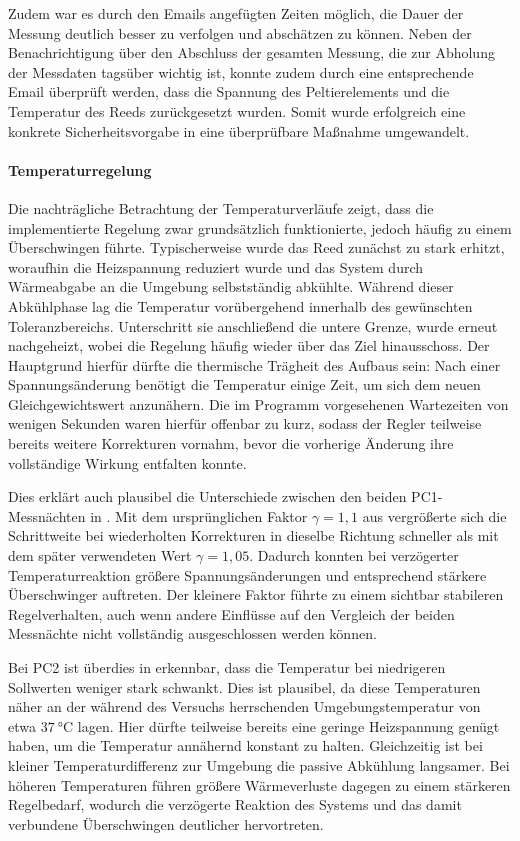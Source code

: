 \documentclass[11pt,a4paper]{article}
\begin{document}
Zudem war es durch den Emails angefügten Zeiten möglich, die Dauer der Messung deutlich besser zu verfolgen und abschätzen zu können. Neben der Benachrichtigung über den Abschluss der gesamten Messung, die zur Abholung der Messdaten tagsüber wichtig ist, konnte zudem durch eine entsprechende Email überprüft werden, dass die Spannung des Peltierelements und die Temperatur des Reeds zurückgesetzt wurden. Somit wurde erfolgreich eine konkrete Sicherheitsvorgabe in eine überprüfbare Maßnahme umgewandelt. 


\paragraph{Temperaturregelung}
Die nachträgliche Betrachtung der Temperaturverläufe zeigt, dass die implementierte Regelung zwar grundsätzlich funktionierte, jedoch häufig zu einem Überschwingen führte. Typischerweise wurde das Reed zunächst zu stark erhitzt, woraufhin die Heizspannung reduziert wurde und das System durch Wärmeabgabe an die Umgebung selbstständig abkühlte. Während dieser Abkühlphase lag die Temperatur vorübergehend innerhalb des gewünschten Toleranzbereichs. Unterschritt sie anschließend die untere Grenze, wurde erneut nachgeheizt, wobei die Regelung häufig wieder über das Ziel hinausschoss. Der Hauptgrund hierfür dürfte die thermische Trägheit des Aufbaus sein: Nach einer Spannungsänderung benötigt die Temperatur einige Zeit, um sich dem neuen Gleichgewichtswert anzunähern. Die im Programm vorgesehenen Wartezeiten von wenigen Sekunden waren hierfür offenbar zu kurz, sodass der Regler teilweise bereits weitere Korrekturen vornahm, bevor die vorherige Änderung ihre vollständige Wirkung entfalten konnte.

Dies erklärt auch plausibel die Unterschiede zwischen den beiden PC1-Messnächten in . Mit dem ursprünglichen Faktor $\gamma=1{,}1$ aus  vergrößerte sich die Schrittweite bei wiederholten Korrekturen in dieselbe Richtung schneller als mit dem später verwendeten Wert $\gamma=1{,}05$. Dadurch konnten bei verzögerter Temperaturreaktion größere Spannungsänderungen und entsprechend stärkere Überschwinger auftreten. Der kleinere Faktor führte zu einem sichtbar stabileren Regelverhalten, auch wenn andere Einflüsse auf den Vergleich der beiden Messnächte nicht vollständig ausgeschlossen werden können.

Bei PC2 ist überdies in  erkennbar, dass die Temperatur bei niedrigeren Sollwerten weniger stark schwankt. Dies ist plausibel, da diese Temperaturen näher an der während des Versuchs herrschenden Umgebungstemperatur von etwa $\qty{37}{\degreeCelsius}$ lagen. Hier dürfte teilweise bereits eine geringe Heizspannung genügt haben, um die Temperatur annähernd konstant zu halten. Gleichzeitig ist bei kleiner Temperaturdifferenz zur Umgebung die passive Abkühlung langsamer. Bei höheren Temperaturen führen größere Wärmeverluste dagegen zu einem stärkeren Regelbedarf, wodurch die verzögerte Reaktion des Systems und das damit verbundene Überschwingen deutlicher hervortreten.
\end{document}
